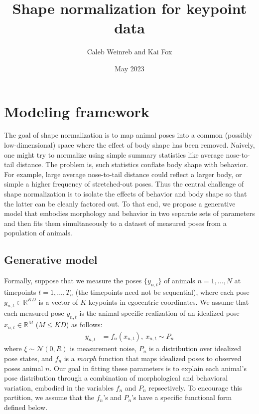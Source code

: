 \documentclass{article}         %
\title{Shape normalization for keypoint data}
\author{Caleb Weinreb and Kai Fox}
\date{May 2023}
\newcommand{\NN}{\mathcal{N}}
\begin{document}
\maketitle

\section{Modeling framework}
\label{sec:model-fwk}

The goal of shape normalization is to map animal poses into a common (possibly low-dimensional) space where the effect of body shape has been removed. Naively, one might try to normalize using simple summary statistics like average nose-to-tail distance. The problem is, such statistics conflate body shape with behavior. For example, large average nose-to-tail distance could reflect a larger body, or simple a higher frequency of stretched-out poses. Thus the central challenge of shape normalization is to isolate the effects of behavior and body shape so that the latter can be cleanly factored out. To that end, we propose a generative model that embodies morphology and behavior in two separate sets of parameters and then fits them simultaneously to a dataset of measured poses from a population of animals.

\subsection{Generative model}

Formally, suppose that we measure the poses $\{y_{n,t}\}$ of animals $n=1,...,N$ at timepoints $t=1,...,T_n$ (the timepoints need not be sequential), where each pose $y_{n, t} \in \mathbb{R}^{KD}$ is a vector of $K$ keypoints in egocentric coordinates. We assume that each measured pose $y_{n,t}$ is the animal-specific realization of an idealized pose $x_{n,t} \in \mathbb{R}^M$ ($M \le KD$) as follows:
%
\begin{align}
    y_{n,t} & = f_n(x_{n,t}), \ x_{n,t} \sim P_n
\end{align}
%
where $\xi \sim \NN(0, R)$ is measurement noise, $P_n$ is a distribution over idealized pose states, and $f_n$ is a \textit{morph} function that maps idealized poses to observed poses animal $n$. Our goal in fitting these parameters is to explain each animal's pose distribution through a combination of morphological and behavioral variation, embodied in the variables $f_n$ and $P_n$ repsectively. To encourage this partition, we assume that the $f_n$'s and $P_n$'s have a specific functional form defined below. 
\end{document}
